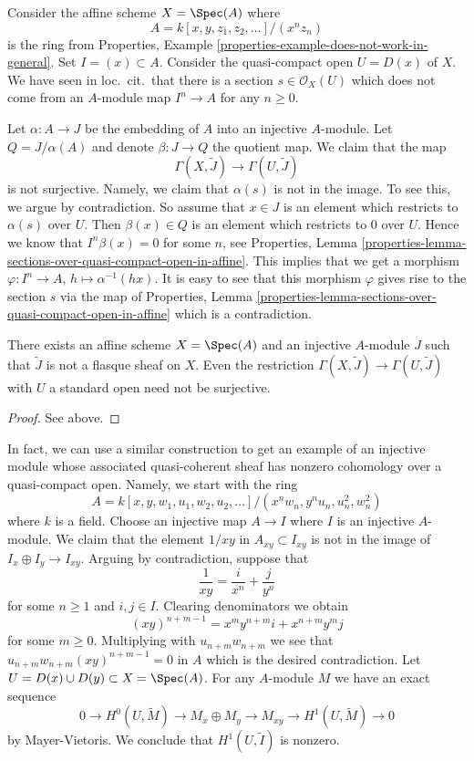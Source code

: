 \medskip\noindent
Consider the affine scheme $X = \Spec(A)$ where
$$
A = k[x, y, z_1, z_2, \ldots]/(x^nz_n)
$$
is the ring from
Properties, Example \ref{properties-example-does-not-work-in-general}.
Set $I = (x) \subset A$. Consider the quasi-compact open $U = D(x)$ of $X$.
We have seen in loc.\ cit.\ that there is a section
$s \in \mathcal{O}_X(U)$ which does not come from an $A$-module
map $I^n \to A$ for any $n \geq 0$.

\medskip\noindent
Let $\alpha : A \to J$ be the embedding of $A$ into an injective $A$-module.
Let $Q = J/\alpha(A)$ and denote $\beta : J \to Q$ the quotient map.
We claim that the map
$$
\Gamma(X, \widetilde{J})
\longrightarrow
\Gamma(U, \widetilde{J})
$$
is not surjective. Namely, we claim that $\alpha(s)$ is not in the image.
To see this, we argue by contradiction. So assume that $x \in J$ is an
element which restricts to $\alpha(s)$ over $U$. Then $\beta(x) \in Q$
is an element which restricts to $0$ over $U$. Hence we know that
$I^n\beta(x) = 0$ for some $n$, see
Properties,
Lemma \ref{properties-lemma-sections-over-quasi-compact-open-in-affine}.
This implies that we get a morphism
$\varphi : I^n \to A$, $h \mapsto \alpha^{-1}(hx)$. It is easy to see that
this morphism $\varphi$ gives rise to the section $s$ via the map of
Properties,
Lemma \ref{properties-lemma-sections-over-quasi-compact-open-in-affine}
which is a contradiction.

\begin{lemma}
\label{lemma-nonflasque}
There exists an affine scheme $X = \Spec(A)$ and an injective
$A$-module $J$ such that $\widetilde{J}$ is not a flasque sheaf on $X$.
Even the restriction $\Gamma(X, \widetilde{J}) \to \Gamma(U, \widetilde{J})$
with $U$ a standard open need not be surjective.
\end{lemma}

\begin{proof}
See above.
\end{proof}

\noindent
In fact, we can use a similar construction to get an example of an
injective module whose associated quasi-coherent sheaf has nonzero
cohomology over a quasi-compact open. Namely, we start with the ring
$$
A = k[x, y, w_1, u_1, w_2, u_2, \ldots]/(x^nw_n, y^nu_n, u_n^2, w_n^2)
$$
where $k$ is a field. Choose an injective map $A \to I$ where $I$ is an
injective $A$-module. We claim that the element $1/xy$ in
$A_{xy} \subset I_{xy}$ is not in the image of $I_x \oplus I_y \to I_{xy}$.
Arguing by contradiction, suppose that
$$
\frac{1}{xy} = \frac{i}{x^n} + \frac{j}{y^n}
$$
for some $n \geq 1$ and $i, j \in I$. Clearing denominators we obtain
$$
(xy)^{n + m - 1} = x^my^{n + m}i + x^{n + m}y^mj
$$
for some $m \geq 0$. Multiplying with $u_{n + m}w_{n + m}$ we see
that $u_{n + m}w_{n + m}(xy)^{n + m - 1} = 0$ in $A$ which is the
desired contradiction.
Let $U = D(x) \cup D(y) \subset X = \Spec(A)$. For any $A$-module
$M$ we have an exact sequence
$$
0 \to H^0(U, \widetilde{M}) \to M_x \oplus M_y \to M_{xy} \to
H^1(U, \widetilde{M}) \to 0
$$
by Mayer-Vietoris. We conclude that $H^1(U, \widetilde{I})$ is nonzero.

